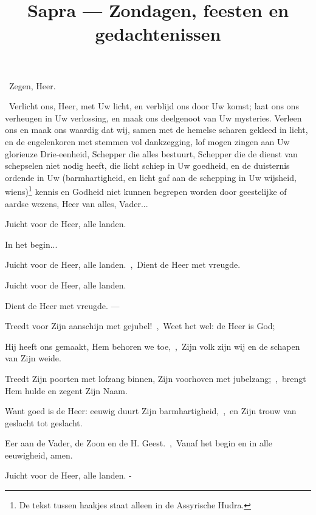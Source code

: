 \documentclass[12pt,twoside,a5paper]{article}
\begin{document}
\title{Sapra --- Zondagen, feesten en gedachtenissen}
\author{}
\date{}
\maketitle


\begin{halfparskip}
\dd~Zegen, Heer.

\cc~Verlicht ons, Heer, met Uw licht, en verblijd ons door Uw komst; laat ons ons verheugen in Uw verlossing, en maak ons deelgenoot van Uw mysteries. Verleen ons en maak ons waardig dat wij, samen met de hemelse scharen gekleed in licht, en de engelenkoren met stemmen vol dankzegging, lof mogen zingen aan Uw glorieuze Drie-eenheid, Schepper die alles bestuurt, Schepper die de dienst van schepselen niet nodig heeft, die licht schiep in Uw goedheid, en de duisternis ordende in Uw (barmhartigheid, en licht gaf aan de schepping in Uw wijsheid, wiens)\footnote{De tekst tussen haakjes staat alleen in de Assyrische Hudra.} kennis en Godheid niet kunnen begrepen worden door geestelijke of aardse wezens, Heer van alles, Vader... 
\end{halfparskip}


\begin{halfparskip}
   Juicht voor de Heer, alle landen.

    In het begin...

  Juicht voor de Heer, alle landen.~\sep\ Dient de Heer met vreugde.

  \fullline
   

  Juicht voor de Heer, alle landen.

  Dient de Heer met vreugde. --- 

  \fullline
   Treedt voor Zijn aanschijn met gejubel!~\sep\ Weet het wel: de Heer is God;

  Hij heeft ons gemaakt, Hem behoren we toe,~\sep\ Zijn volk zijn wij en de schapen van Zijn weide.

  Treedt Zijn poorten met lofzang binnen, Zijn voorhoven met jubelzang;~\sep\ brengt Hem hulde en zegent Zijn Naam.

  Want goed is de Heer: eeuwig duurt Zijn barmhartigheid,~\sep\ en Zijn trouw van geslacht tot geslacht.

  Eer aan de Vader, de Zoon en de H. Geest.~\sep\ Vanaf het begin en in alle eeuwigheid, amen.

  Juicht voor de Heer, alle landen. - 
\end{halfparskip}
\end{document}
